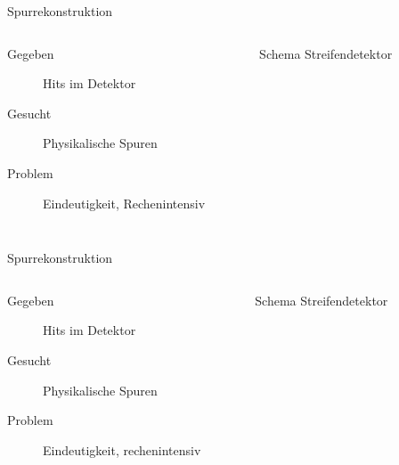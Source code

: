 

\begin{frame}{Spurrekonstruktion}
	\begin{columns}[T]
			\begin{description}
			  \item[Gegeben] Hits im Detektor
			  \item[Gesucht] Physikalische Spuren
			  \item[Problem] Eindeutigkeit, Rechenintensiv
			\end{description}
			
	    	\begin{figure}[htbp]
			  \centering
			   
			  \caption{Schema Streifendetektor}
			\end{figure}
    \end{columns}
\end{frame}

\begin{frame}{Spurrekonstruktion}
	\begin{columns}[T]
				\begin{description}
			  \item[Gegeben] Hits im Detektor
			  \item[Gesucht] Physikalische Spuren
			  \item[Problem] Eindeutigkeit, rechenintensiv
			\end{description}
	    	\begin{figure}[htbp]
			  \centering
			   
			  \caption{Schema Streifendetektor}
			\end{figure}
    \end{columns}
\end{frame}

% 			   
% 		
